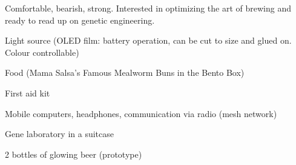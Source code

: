 \newpage
\begin{npcBox}[title=The Barrel continued]
    \begin{npcDescription}
    Comfortable, bearish, strong. Interested in optimizing the art of brewing and ready to read up on genetic engineering.
    \end{npcDescription}


    \begin{equipment}
    \item Light source (OLED film: battery operation, can be cut to size and glued on. Colour controllable)
    \item Food (Mama Salsa's Famous Mealworm Buns in the Bento Box)
    \item First aid kit
    \item Mobile computers, headphones, communication via radio (mesh network)
    \item Gene laboratory in a suitcase
    \item 2 bottles of glowing beer (prototype)
    \end{equipment}
\end{npcBox}



